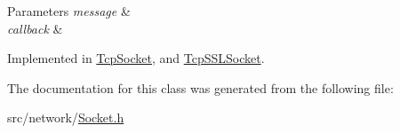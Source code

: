 \begin{DoxyParams}{Parameters}
{\em message} & \\
\hline
{\em callback} & \\
\hline
\end{DoxyParams}


Implemented in \hyperlink{class_tcp_socket_adc03eee685e2cd6704dd2042142d71dd}{Tcp\-Socket}, and \hyperlink{class_tcp_s_s_l_socket_a6b35535438fa43029629a0be9af6ae4a}{Tcp\-S\-S\-L\-Socket}.



The documentation for this class was generated from the following file\-:\begin{DoxyCompactItemize}
\item 
src/network/\hyperlink{_socket_8h}{Socket.\-h}\end{DoxyCompactItemize}
